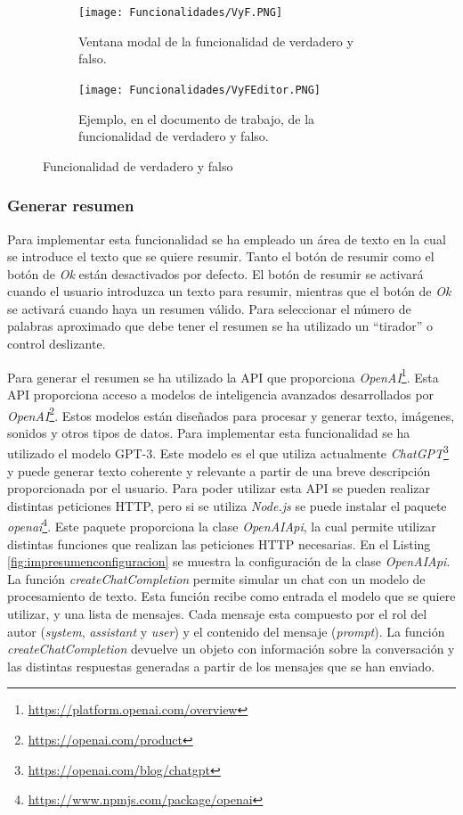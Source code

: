 \begin{figure}[ht!]
  \centering
  \begin{subfigure}{\textwidth}
    \centering
    \texttt{[image: Funcionalidades/VyF.PNG]}
    \caption{Ventana modal de la funcionalidad de verdadero y falso.}
    \label{fig:vyf}
  \end{subfigure}

  \begin{subfigure}{\textwidth}
    \centering
    \texttt{[image: Funcionalidades/VyFEditor.PNG]}
    \caption{Ejemplo, en el documento de trabajo, de la funcionalidad de verdadero y falso.}
    \label{fig:vyfEdit}
  \end{subfigure}

  \caption{Funcionalidad de verdadero y falso}
  \label{fig:veryfalso}
\end{figure}


\subsubsection{Generar resumen}
\label{sec:impresumen}
Para implementar esta funcionalidad se ha empleado un área de texto en la cual se introduce el texto que se quiere resumir. Tanto el botón de resumir como el botón de \textit{Ok} están desactivados por defecto. El botón de resumir se activará cuando el usuario introduzca un texto para resumir, mientras que el botón de \textit{Ok} se activará cuando haya un resumen válido. Para seleccionar el número de palabras aproximado que debe tener el resumen se ha utilizado un ``tirador'' o control deslizante.

Para generar el resumen se ha utilizado la API que proporciona \textit{OpenAI}\footnote{\url{https://platform.openai.com/overview}}. Esta API proporciona acceso a modelos de inteligencia avanzados desarrollados por \textit{OpenAI}\footnote{\url{https://openai.com/product}}. Estos modelos están diseñados para procesar y generar texto, imágenes, sonidos y otros tipos de datos. Para implementar esta funcionalidad se ha utilizado el modelo GPT-3. Este modelo es el que utiliza actualmente \textit{ChatGPT}\footnote{\url{https://openai.com/blog/chatgpt}} y puede generar texto coherente y relevante a partir de una breve descripción proporcionada por el usuario. Para poder utilizar esta API se pueden realizar distintas peticiones HTTP, pero si se utiliza \textit{Node.js} se puede instalar el paquete \textit{openai}\footnote{\url{https://www.npmjs.com/package/openai}}. Este paquete proporciona la clase \textit{OpenAIApi}, la cual permite utilizar distintas funciones que realizan las peticiones HTTP necesarias. En el Listing \ref{fig:impresumenconfiguracion} se muestra la configuración de la clase \textit{OpenAIApi}. La función \textit{createChatCompletion} permite simular un chat con un modelo de procesamiento de texto. Esta función recibe como entrada el modelo que se quiere utilizar, y una lista de mensajes. Cada mensaje esta compuesto por el rol del autor (\textit{system}, \textit{assistant} y \textit{user}) y el contenido del mensaje (\textit{prompt}). La función \textit{createChatCompletion} devuelve un objeto con información sobre la conversación y las distintas respuestas generadas a partir de los mensajes que se han enviado.

